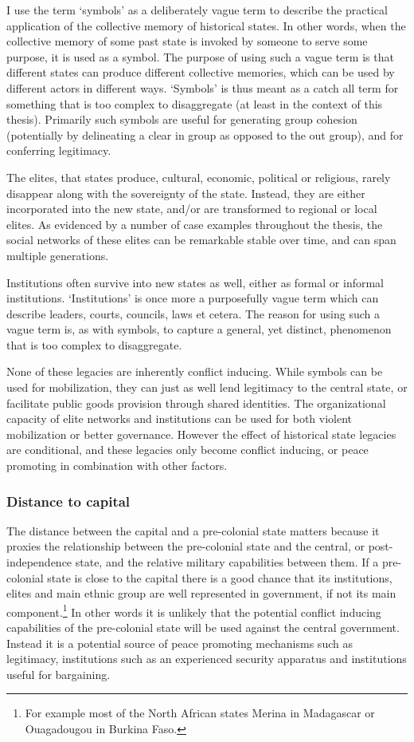 I use the term `symbols' as a deliberately vague term to describe the practical
application of the collective memory of historical states. In other words, when
the collective memory of some past state is invoked by someone to serve some
purpose, it is used as a symbol. The purpose of using such a vague term is that
different states can produce different collective memories, which can be used by
different actors in different ways. `Symbols' is thus meant as a catch all term
for something that is too complex to disaggregate (at least in the context of
this thesis). Primarily such symbols are useful for generating group cohesion
(potentially by delineating a clear in group as opposed to the out group), and
for conferring legitimacy.

The elites, that states produce, cultural, economic, political or religious,
rarely disappear along with the sovereignty of the state. Instead, they are
either incorporated into the new state, and/or are transformed to regional or
local elites. As evidenced by a number of case examples throughout the thesis,
the social networks of these elites can be remarkable stable over time, and can
span multiple generations.

Institutions often survive into new states as well, either as formal or informal
institutions. `Institutions' is once more a purposefully vague term which can
describe leaders, courts, councils, laws et cetera. The reason for using such a
vague term is, as with symbols, to capture a general, yet distinct, phenomenon
that is too complex to disaggregate.

None of these legacies are inherently conflict inducing. While symbols can be
used for mobilization, they can just as well lend legitimacy to the central
state, or facilitate public goods provision through shared identities. The
organizational capacity of elite networks and institutions can be used for both
violent mobilization or better governance. However the effect of historical
state legacies are conditional, and these legacies only become conflict
inducing, or peace promoting in combination with other factors.

\subsubsection{Distance to capital} \label{dtc}

The distance between the capital and a pre-colonial state matters because it
proxies the relationship between the pre-colonial state and the central, or
post-independence state, and the relative military capabilities between them. If
a pre-colonial state is close to the capital there is a good chance that its
institutions, elites and main ethnic group are well represented in government,
if not its main component.\footnote{For example most of the North African states
Merina in Madagascar or Ouagadougou in Burkina Faso.} In other words it is
unlikely that the potential conflict inducing capabilities of the pre-colonial
state will be used against the central government. Instead it is a potential
source of peace promoting mechanisms such as legitimacy, institutions such as an
experienced security apparatus and institutions useful for bargaining.

